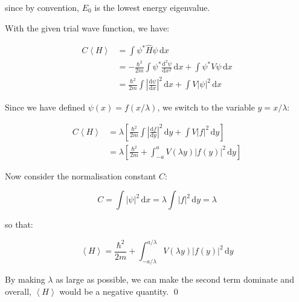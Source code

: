 \documentclass[12pt]{article}
\begin{document}
since by convention, $E_{0}$ is the lowest energy eigenvalue.

With the given trial wave function, we have:

\begin{equation}
    \begin{split}
        C\left\langle H \right\rangle &= \int \psi^{*} \hat{H} \psi \, \mathrm{d}x \\
        &= -\frac{\hbar^{2}}{2m} \int \psi^{*} \frac{\mathrm{d}^{2} \psi}{\mathrm{d}x^{2}} \, \mathrm{d}x + \int \psi^{*} V \psi \, \mathrm{d}x \\
        &= \frac{\hbar^{2}}{2m} \int \left\lvert \frac{\mathrm{d} \psi}{\mathrm{d}x} \right\rvert^{2} \, \mathrm{d}x + \int V \left\lvert \psi \right\rvert^{2} \, \mathrm{d}x
    \end{split}
\end{equation}

Since we have defined $\psi(x) = f(x/\lambda)$, we switch to the variable $y = x/\lambda$:

\begin{equation}
    \begin{split}
        C\left\langle H \right\rangle &= \lambda \left[ \frac{\hbar^{2}}{2m} \int \left\lvert \frac{\mathrm{d} f}{\mathrm{d}y} \right\rvert^{2} \, \mathrm{d}y + \int V \left\lvert f \right\rvert^{2} \, \mathrm{d}y \right] \\
        &= \lambda \left[ \frac{\hbar^{2}}{2m} + \int_{-a}^{a} V(\lambda y) \left\lvert f(y) \right\rvert^{2} \, \mathrm{d}y \right]
    \end{split}
\end{equation}

Now consider the normalisation constant $C$:

\begin{equation}
    C = \int \left\lvert \psi \right\rvert^{2} \, \mathrm{d}x = \lambda \int \left\lvert f \right\rvert^{2} \, \mathrm{d}y = \lambda
\end{equation}

so that:

\begin{equation}
    \left\langle H \right\rangle = \frac{\hbar^{2}}{2m} + \int_{-a/\lambda}^{a/\lambda} V(\lambda y) \left\lvert f(y) \right\rvert^{2} \, \mathrm{d}y
\end{equation}

By making $\lambda$ as large as possible, we can make the second term dominate and overall, $\left\langle H \right\rangle$ would be a negative quantity.
\qed
\end{document}

